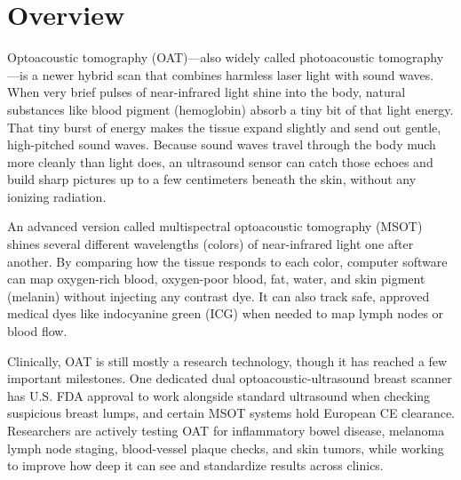 \label{ch:infographic-oat}

\section{Overview}

Optoacoustic tomography (OAT)---also widely called photoacoustic tomography---is a newer hybrid scan that combines harmless laser light with sound waves. When very brief pulses of near-infrared light shine into the body, natural substances like blood pigment (hemoglobin) absorb a tiny bit of that light energy. That tiny burst of energy makes the tissue expand slightly and send out gentle, high-pitched sound waves. Because sound waves travel through the body much more cleanly than light does, an ultrasound sensor can catch those echoes and build sharp pictures up to a few centimeters beneath the skin, without any ionizing radiation.

An advanced version called multispectral optoacoustic tomography (MSOT) shines several different wavelengths (colors) of near-infrared light one after another. By comparing how the tissue responds to each color, computer software can map oxygen-rich blood, oxygen-poor blood, fat, water, and skin pigment (melanin) without injecting any contrast dye. It can also track safe, approved medical dyes like indocyanine green (ICG) when needed to map lymph nodes or blood flow.

Clinically, OAT is still mostly a research technology, though it has reached a few important milestones. One dedicated dual optoacoustic-ultrasound breast scanner has U.S. FDA approval to work alongside standard ultrasound when checking suspicious breast lumps, and certain MSOT systems hold European CE clearance. Researchers are actively testing OAT for inflammatory bowel disease, melanoma lymph node staging, blood-vessel plaque checks, and skin tumors, while working to improve how deep it can see and standardize results across clinics.

